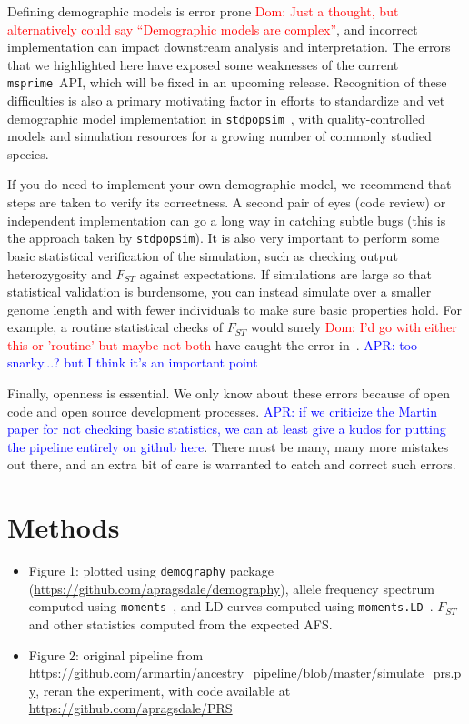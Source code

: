 \documentclass{article}
\newcommand{\msprime}[0]{\texttt{msprime}}
\newcommand{\stdpopsim}[0]{\texttt{stdpopsim}}
\newcommand{\aprcomment}[1]{{\textcolor{blue}{APR: #1}}}
\newcommand{\dncomment}[1]{{\textcolor{red}{Dom: #1}}}
\begin{document}
Defining demographic models is error prone \dncomment{Just a thought, but alternatively could say
``Demographic models are complex''}, and incorrect implementation can
impact downstream analysis and interpretation. The errors that we highlighted here have
exposed some weaknesses of the current \msprime\ API, which will be fixed in an
upcoming release. Recognition of these difficulties is also a
primary motivating factor in efforts to standardize and vet demographic model
implementation in \stdpopsim~\citep{adrion2019community}, with quality-controlled
models and simulation resources for a growing number of commonly studied species.

If you do need to implement your own demographic model, we recommend that steps are taken to
verify its correctness. A second pair of eyes (code review) or independent implementation
can go a long way in catching subtle bugs (this is the approach taken by \stdpopsim). It is also
very important to perform some basic statistical verification of the simulation, such as checking
output heterozygosity and $F_{ST}$ against expectations. If simulations are large so that
statistical validation is burdensome, you can instead simulate over a smaller genome length
and with fewer individuals to make sure basic properties hold. For example, a routine statistical
checks of $F_{ST}$ would surely
\dncomment{I'd go with either this or 'routine' but maybe not both
}
have caught the error in~\citet{martin2017human}.
\aprcomment{too snarky...? but I think it's an important point}

Finally, openness is essential. We only know about these errors because of open code and
open source development processes. \aprcomment{if we criticize the Martin paper for not
checking basic statistics, we can at least give a kudos for putting the pipeline entirely on
github here}. There must be many, many more mistakes out there, and an extra bit of care
is warranted to catch and correct such errors.

\section{Methods}

\begin{itemize}
\item Figure 1: plotted using \texttt{demography} package (\url{https://github.com/apragsdale/demography}),
allele frequency spectrum computed using \texttt{moments}~\citep{jouganous2017inferring}, and LD curves
computed using \texttt{moments.LD}~\citep{ragsdale2019models}. $F_{ST}$ and other statistics computed
from the expected AFS.
\item Figure 2: original pipeline from \url{https://github.com/armartin/ancestry_pipeline/blob/master/simulate_prs.py},
reran the experiment, with code available at \url{https://github.com/apragsdale/PRS}
\end{itemize}
\end{document}
